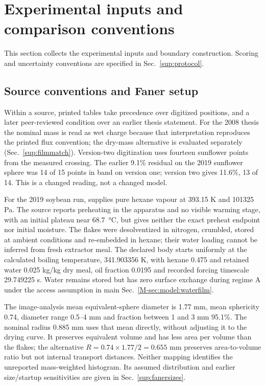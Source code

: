 \section{Experimental inputs and comparison conventions}
\label{sup:detail:inputs}\label{sup:detail:numerics}\label{sup:detail:ensemble}
This section collects the experimental inputs and boundary construction.
Scoring and uncertainty conventions are specified in Sec.~\ref{sup:protocol}.

\subsection{Source conventions and Faner setup}
\label{sup:fanerinputs}
Within a source, printed tables take precedence over digitized positions,
and a later peer-reviewed condition over an earlier thesis statement.
For the 2008 thesis the nominal mass is read as wet charge because that
interpretation reproduces the printed flux convention; the dry-mass
alternative is evaluated separately (Sec.~\ref{sup:filmmatch}). Version-two
digitization uses fourteen sunflower points from the measured crossing.
The earlier 9.1\% residual on the 2019 sunflower sphere was 14 of 15
points in band on version one; version two gives 11.6\%, 13 of 14.
This is a changed reading, not a changed model.

For the 2019 soybean run, \citet{faner2019kinetics} supplies pure hexane
vapour at 393.15 K and 101325 Pa. The source reports preheating in the
apparatus and no visible warming stage, with an initial plateau near
\SI{68.7}{\celsius}, but gives neither the exact preheat endpoint nor
initial moisture. The flakes were desolventized in nitrogen, crumbled,
stored at ambient conditions and re-embedded in hexane; their water
loading cannot be inferred from fresh extractor meal. The declared body
starts uniformly at the calculated boiling temperature, 341.903356 K,
with hexane 0.475 and retained water 0.025 kg/kg dry meal, oil fraction
0.0195 and recorded forcing timescale 29.749225 s. Water remains stored
but has zero surface exchange during regime A under the access assumption
in main Sec.~\ref*{M-sec:model:waterfilm}.

The image-analysis mean equivalent-sphere diameter is 1.77 mm, mean
sphericity 0.74, diameter range 0.5--4 mm and fraction between 1 and 3 mm
95.1\%. The nominal radius 0.885 mm uses that mean directly, without
adjusting it to the drying curve. It preserves equivalent volume and has
less area per volume than the flakes; the alternative
$R=0.74\times1.77/2=0.655$ mm preserves area-to-volume ratio but not
internal transport distances. Neither mapping identifies the unreported
mass-weighted histogram. Its assumed distribution and earlier
size/startup sensitivities are given in Sec.~\ref{sup:fanersizes}.

